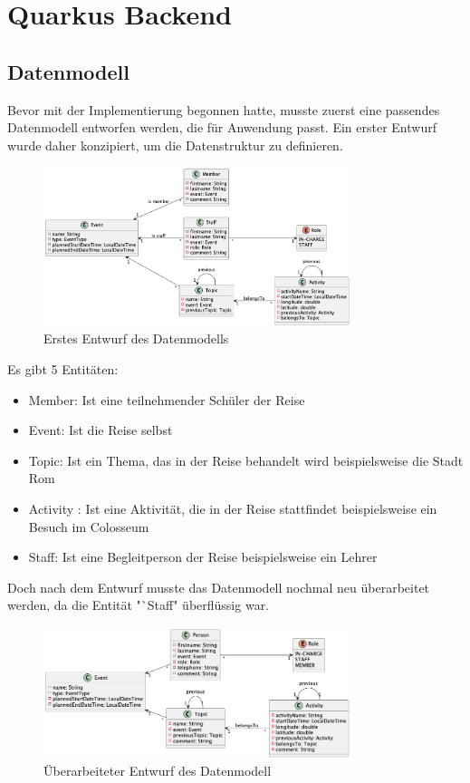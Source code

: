 \section{Quarkus Backend}

\subsection{Datenmodell}

Bevor mit der Implementierung begonnen hatte, musste zuerst eine passendes Datenmodell entworfen werden, die für Anwendung passt. Ein erster Entwurf wurde daher konzipiert, um die Datenstruktur zu definieren.

\begin{figure}[H]
    \centering
    \includegraphics[width=0.8\textwidth]{pics/Datenmodell.png}
    \caption{Erstes Entwurf des Datenmodells}
    \label{fig:datenmodell}
\end{figure}

Es gibt 5 Entitäten:

\begin{itemize}
    \item Member: Ist eine teilnehmender Schüler der Reise
    \item Event: Ist die Reise selbst
    \item Topic: Ist ein Thema, das in der Reise behandelt wird beispielsweise die Stadt Rom
    \item Activity : Ist eine Aktivität, die in der Reise stattfindet beispielsweise ein Besuch im Colosseum
    \item Staff: Ist eine Begleitperson der Reise beispielsweise ein Lehrer
\end{itemize}


Doch nach dem Entwurf musste das Datenmodell nochmal neu überarbeitet werden, da die Entität "`Staff" überflüssig war. 


\begin{figure}[H]
    \centering
    \includegraphics[width=0.8\textwidth]{pics/datenmodell_1.png}
    \caption{Überarbeiteter Entwurf des Datenmodell}
    \label{fig:datenmodell_Second}
\end{figure}

